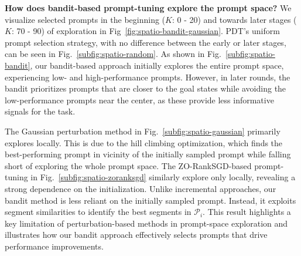 \documentclass{article}
\begin{document}

\textbf{How does bandit-based prompt-tuning explore the prompt space?}
We visualize selected prompts in the beginning ($K$: 0 - 20) and towards later stages ($K$: 70 - 90) of exploration in Fig~\ref{fig:spatio-bandit-gaussian}. 
PDT's uniform prompt selection strategy, with no difference between the early or later stages, can be seen in Fig.~\ref{subfig:spatio-random}.
As shown in Fig.~\ref{subfig:spatio-bandit}, our bandit-based approach initially explores the entire prompt space, experiencing low- and high-performance prompts. However, in later rounds, the bandit prioritizes prompts that are closer to the goal states while avoiding the low-performance prompts near the center,  as these provide less informative signals for the task.

The Gaussian perturbation method in Fig.~\ref{subfig:spatio-gaussian} primarily explores locally. This is due to the hill climbing optimization, which finds the best-performing prompt in vicinity of the initially sampled prompt while falling short of exploring the whole prompt space. 
The ZO-RankSGD-based prompt-tuning in Fig.~\ref{subfig:spatio-zoranksgd} similarly explore only locally, revealing a strong dependence on the initialization. 
Unlike incremental approaches, our bandit method is less reliant on the initially sampled prompt. Instead, it exploits segment similarities to identify the best segments in $\mathcal{P}_i$.  
This result highlights a key limitation of perturbation-based methods in prompt-space exploration and illustrates how our bandit approach effectively selects prompts that drive performance improvements.
\end{document}

